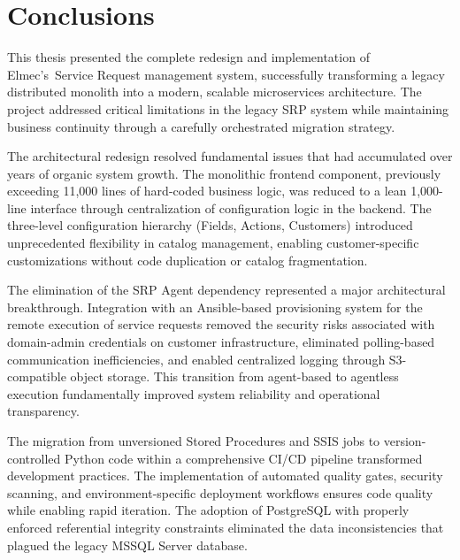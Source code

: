 \chapter*{Conclusions}

This thesis presented the complete redesign and implementation of Elmec's~Service Request management system, successfully transforming a legacy distributed monolith into a modern, scalable microservices architecture. The project addressed critical limitations in the legacy SRP system while maintaining business continuity through a carefully orchestrated migration strategy.


The architectural redesign resolved fundamental issues that had accumulated over years of organic system growth. The monolithic frontend component, previously exceeding 11,000 lines of hard-coded business logic, was reduced to a lean 1,000-line interface through centralization of configuration logic in the backend. The three-level configuration hierarchy (Fields, Actions, Customers) introduced unprecedented flexibility in catalog management, enabling customer-specific customizations without code duplication or catalog fragmentation.

The elimination of the SRP Agent dependency represented a major architectural breakthrough. Integration with an Ansible-based provisioning system for the remote execution of service requests removed the security risks associated with domain-admin credentials on customer infrastructure, eliminated polling-based communication inefficiencies, and enabled centralized logging through S3-compatible object storage. This transition from agent-based to agentless execution fundamentally improved system reliability and operational transparency.

The migration from unversioned Stored Procedures and SSIS jobs to version-controlled Python code within a comprehensive CI/CD pipeline transformed development practices. The implementation of automated quality gates, security scanning, and environment-specific deployment workflows ensures code quality while enabling rapid iteration. The adoption of PostgreSQL with properly enforced referential integrity constraints eliminated the data inconsistencies that plagued the legacy MSSQL Server database.

